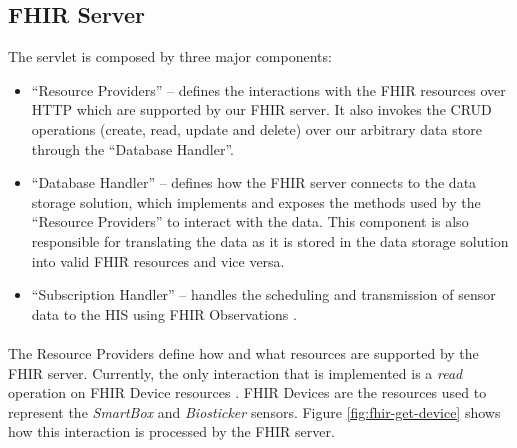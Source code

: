 \subsection{FHIR Server} 

The servlet is composed by three major components:

\begin{itemize}
    \item ``Resource Providers'' -- defines the interactions with the \acs{FHIR} resources over \acs{HTTP} which are supported by our \acs{FHIR} server. It also invokes the CRUD operations (create, read, update and delete) over our arbitrary data store through the ``Database Handler''.
    \item ``Database Handler'' -- defines how the \acs{FHIR} server connects to the data storage solution, which implements and exposes the methods used by the ``Resource Providers'' to interact with the data. This component is also responsible for translating the data as it is stored in the data storage solution into valid \acs{FHIR} resources and vice versa.
    \item ``Subscription Handler'' -- handles the scheduling and transmission of sensor data to the \acs{HIS} using \acs{FHIR} Observations \cite{fhir}.
\end{itemize}

\paragraph{} The Resource Providers define how and what resources are supported by the \acs{FHIR} server. Currently, the only interaction that is implemented is a \textit{read} operation \cite{fhir} on \acs{FHIR} Device resources \cite{fhir}. \acs{FHIR} Devices are the resources used to represent the \textit{SmartBox} and \textit{Biosticker} sensors. Figure \ref{fig:fhir-get-device} shows how this interaction is processed by the \acs{FHIR} server.

